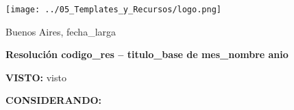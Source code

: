 \documentclass[12pt]{article}
\begin{document}
\begin{minipage}{0.3\textwidth}
  \vspace{-0.6cm}
  \texttt{[image: ../05\_Templates\_y\_Recursos/logo.png]}
\end{minipage}
\hfill
\begin{minipage}{0.65\textwidth}
  \begin{flushright}
    Buenos Aires, {{ fecha_larga }}
  \end{flushright}
\end{minipage}

\vspace{1cm}

\begin{center}
  \textbf{\large Resolución {{ codigo_res }} – {{ titulo_base }} de {{ mes_nombre }} {{ anio }}}
\end{center}

\vspace{0.8cm}

\textbf{VISTO:}
{{ visto }}

\vspace{0.4cm}

\textbf{CONSIDERANDO:}

\vspace{0.4cm}
\end{document}
